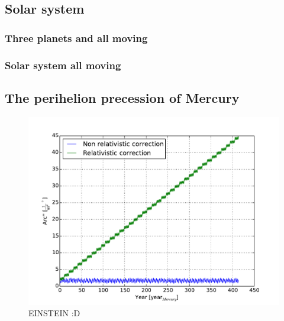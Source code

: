 \subsection{Solar system}


\subsubsection{Three planets and all moving}


\subsubsection{Solar system all moving}














\subsection{The perihelion precession of Mercury}

\begin{figure}[H]
    \centering
    \includegraphics[width=\linewidth]{result/bilder/perihelion.pdf}
    \caption{EINSTEIN :D }
    \label{fig:three-body}
\end{figure}














